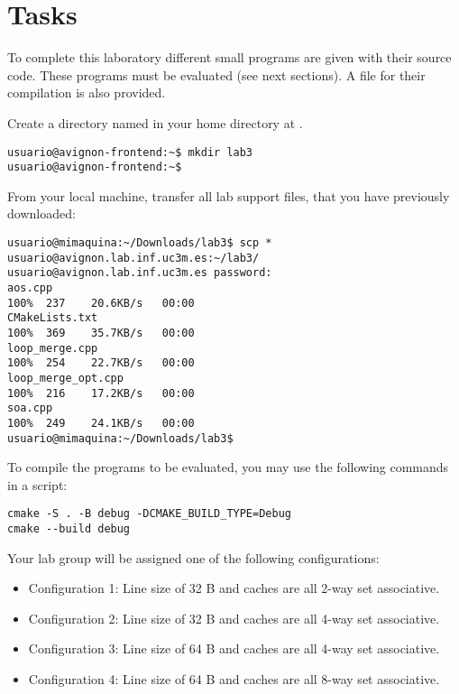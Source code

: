 \section{Tasks}

To complete this laboratory different small programs are given with their
source code. These programs must be evaluated (see next sections). A
 file for their compilation is also provided. 

Create a directory named  in your home directory at .

\begin{lstlisting}[style=terminal,aboveskip=1em,belowskip=1em]
usuario@avignon-frontend:~$ mkdir lab3
usuario@avignon-frontend:~$
\end{lstlisting}

From your local machine, transfer all lab support files, 
that you have previously downloaded:

\begin{lstlisting}[style=terminal,aboveskip=1em,belowskip=1em]
usuario@mimaquina:~/Downloads/lab3$ scp * usuario@avignon.lab.inf.uc3m.es:~/lab3/
usuario@avignon.lab.inf.uc3m.es password: 
aos.cpp                                                            100%  237    20.6KB/s   00:00    
CMakeLists.txt                                                     100%  369    35.7KB/s   00:00    
loop_merge.cpp                                                     100%  254    22.7KB/s   00:00    
loop_merge_opt.cpp                                                 100%  216    17.2KB/s   00:00    
soa.cpp                                                            100%  249    24.1KB/s   00:00    
usuario@mimaquina:~/Downloads/lab3$ 
\end{lstlisting}

To compile the programs to be evaluated, 
you may use the following commands in a script:

\begin{lstlisting}[style=terminal,aboveskip=1em,belowskip=1em]
cmake -S . -B debug -DCMAKE_BUILD_TYPE=Debug
cmake --build debug
\end{lstlisting}


 Your lab group will be assigned one of the following configurations:

\begin{itemize}
\item Configuration 1: Line size of 32 B and caches are all 2-way set associative.
\item Configuration 2: Line size of 32 B and caches are all 4-way set associative.
\item Configuration 3: Line size of 64 B and caches are all 4-way set associative.
\item Configuration 4: Line size of 64 B and caches are all 8-way set associative.
\end{itemize}



